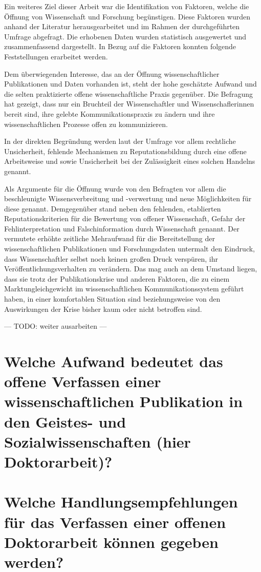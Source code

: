Ein weiteres Ziel dieser Arbeit war die Identifikation von Faktoren, welche die Öffnung von Wissenschaft und Forschung begünstigen. Diese Faktoren wurden anhand der Literatur herausgearbeitet und im Rahmen der durchgeführten Umfrage abgefragt. Die erhobenen Daten wurden statistisch ausgewertet und zusammenfassend dargestellt. In Bezug auf die Faktoren konnten folgende Feststellungen erarbeitet werden.

Dem überwiegenden Interesse, das an der Öffnung wissenschaftlicher Publikationen und Daten vorhanden ist, steht der hohe geschätzte Aufwand und die selten praktizierte offene wissenschaftliche Praxis gegenüber. Die Befragung hat gezeigt, dass nur ein Bruchteil der Wissenschaftler und Wissenschaflerinnen bereit sind, ihre gelebte Kommunikationspraxis zu ändern und ihre wissenschaftlichen Prozesse offen zu kommunizieren.

In der direkten Begründung werden laut der Umfrage vor allem rechtliche Unsicherheit, fehlende Mechanismen zu Reputationsbildung durch eine offene Arbeitsweise und sowie Unsicherheit bei der Zulässigkeit eines solchen Handelns genannt.

Als Argumente für die Öffnung wurde von den Befragten vor allem die beschleunigte Wissensverbreitung und -verwertung und neue Möglichkeiten für diese genannt. Demgegenüber stand neben den fehlenden, etablierten Reputationskriterien für die Bewertung von offener Wissenschaft, Gefahr der Fehlinterpretation und Falschinformation durch Wissenschaft genannt. Der vermutete erhöhte zeitliche Mehraufwand für die Bereitstellung der wissenschaftlichen Publikationen und Forschungsdaten untermalt den Eindruck, dass Wissenschaftler selbst noch keinen großen Druck verspüren, ihr Veröffentlichungsverhalten zu verändern. Das mag auch an dem Umstand liegen, dass sie trotz der Publikationskrise und anderen Faktoren, die zu einem Marktungleichgewicht im wissenschaftlichen Kommunikationssystem geführt haben, in einer komfortablen Situation sind beziehungsweise von den Auswirkungen der Krise bisher kaum oder nicht betroffen sind.

--- TODO: weiter ausarbeiten ---

\section{Welche Aufwand bedeutet das offene Verfassen einer wissenschaftlichen Publikation in den Geistes- und Sozialwissenschaften (hier Doktorarbeit)?}


\section{Welche Handlungsempfehlungen für das Verfassen einer offenen Doktorarbeit können gegeben werden?}
